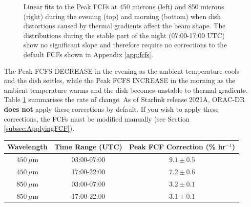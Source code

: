 \begin{figure}
\begin{center}
\caption[FCFs Time of Night Fits]{Linear fits to the Peak FCFs at 450 microns (left) and 850 microns (right)
 during the evening (top) and morning (bottom) when dish distortions caused by thermal gradients affect the 
 beam shape. The distributions during the stable part of the night (07:00-17:00 UTC) show no significant 
 slope and therefore require no corrections to the default FCFs shown in Appendix \ref{app:fcfs}. \label{fig:FCFsTimeOfNightFits}}
\end{center}
\end{figure}

The Peak FCFS DECREASE in the evening as the ambient temperature cools and the dish settles, while
the Peak FCFS INCREASE in the morning as the ambient temperature warms and the dish becomes
unstable to thermal gradients. Table \ref{tab:FCFsTimeOfNight} summarises the rate of change. 
As of Starlink release 2021A, ORAC-DR \textbf{does not} apply these corrections by default. If
you wish to apply these corrections, the FCFs must be modified manually (see Section \ref{subsec:ApplyingFCF}).


\begin{table}[h!]
\begin{center}
\begin{tabular}{|c|c|c|}
 \hline
 \multicolumn{1}{|c|}{Wavelength} &
 \multicolumn{1}{c|}{Time Range (UTC)} &
 \multicolumn{1}{c|}{Peak FCF Correction (\% hr$^{-1}$)}
 \\ \hline
$450~\mu$m & 03:00-07:00 & $9.1\pm0.5$ \\
$450~\mu$m & 17:00-22:00 & $7.2\pm0.6$ \\
\hline
$850~\mu$m & 03:00-07:00 & $3.2\pm0.1$ \\
$850~\mu$m & 17:00-22:00 & $3.1\pm0.1$ \\ \hline
\end{tabular}
\end{center}
\label{tab:FCFsTimeOfNight}
\end{table}

